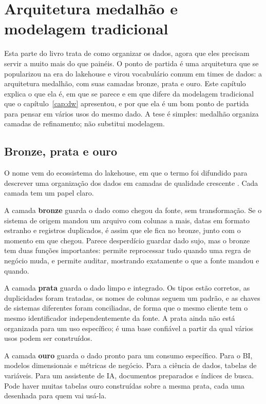 \chapter{Arquitetura medalhão e modelagem tradicional}
\label{cap:medalhao}

Esta parte do livro trata de como organizar os dados, agora que eles precisam servir a
muito mais do que painéis. O ponto de partida é uma arquitetura que se popularizou na era
do lakehouse e virou vocabulário comum em times de dados: a arquitetura medalhão, com suas
camadas bronze, prata e ouro. Este capítulo explica o que ela é, em que se parece e em que
difere da modelagem tradicional que o capítulo~\ref{cap:dw} apresentou, e por que ela é um
bom ponto de partida para pensar em vários usos do mesmo dado. A tese é simples: medalhão
organiza camadas de refinamento; não substitui modelagem.

\section{Bronze, prata e ouro}
\label{sec:bronze-prata-ouro}

O nome vem do ecossistema do lakehouse, em que o termo foi difundido para descrever uma
organização dos dados em camadas de qualidade crescente
\parencite{databricksmedallion,armbrust2021}. Cada camada tem um papel claro.

A camada \textbf{bronze} guarda o dado como chegou da fonte, sem transformação. Se o
sistema de origem mandou um arquivo com colunas a mais, datas em formato estranho e
registros duplicados, é assim que ele fica no bronze, junto com o momento em que chegou.
Parece desperdício guardar dado sujo, mas o bronze tem duas funções importantes: permite
reprocessar tudo quando uma regra de negócio muda, e permite auditar, mostrando exatamente
o que a fonte mandou e quando.

A camada \textbf{prata} guarda o dado limpo e integrado. Os tipos estão corretos, as
duplicidades foram tratadas, os nomes de colunas seguem um padrão, e as chaves de sistemas
diferentes foram conciliadas, de forma que o mesmo cliente tem o mesmo identificador
independentemente da fonte. A prata ainda não está organizada para um uso específico; é
uma base confiável a partir da qual vários usos podem ser construídos.

A camada \textbf{ouro} guarda o dado pronto para um consumo específico. Para o BI, modelos
dimensionais e métricas de negócio. Para a ciência de dados, tabelas de variáveis. Para
um assistente de IA, documentos preparados e índices de busca. Pode haver muitas tabelas
ouro construídas sobre a mesma prata, cada uma desenhada para quem vai usá-la.


